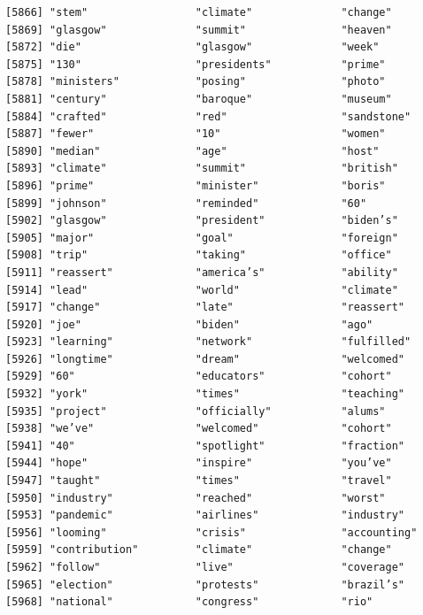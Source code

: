 \documentclass[
  letterpaper,
  DIV=11,
  numbers=noendperiod]{scrartcl}
\begin{document}
\begin{verbatim}
[5866] "stem"                 "climate"              "change"              
[5869] "glasgow"              "summit"               "heaven"              
[5872] "die"                  "glasgow"              "week"                
[5875] "130"                  "presidents"           "prime"               
[5878] "ministers"            "posing"               "photo"               
[5881] "century"              "baroque"              "museum"              
[5884] "crafted"              "red"                  "sandstone"           
[5887] "fewer"                "10"                   "women"               
[5890] "median"               "age"                  "host"                
[5893] "climate"              "summit"               "british"             
[5896] "prime"                "minister"             "boris"               
[5899] "johnson"              "reminded"             "60"                  
[5902] "glasgow"              "president"            "biden’s"             
[5905] "major"                "goal"                 "foreign"             
[5908] "trip"                 "taking"               "office"              
[5911] "reassert"             "america’s"            "ability"             
[5914] "lead"                 "world"                "climate"             
[5917] "change"               "late"                 "reassert"            
[5920] "joe"                  "biden"                "ago"                 
[5923] "learning"             "network"              "fulfilled"           
[5926] "longtime"             "dream"                "welcomed"            
[5929] "60"                   "educators"            "cohort"              
[5932] "york"                 "times"                "teaching"            
[5935] "project"              "officially"           "alums"               
[5938] "we’ve"                "welcomed"             "cohort"              
[5941] "40"                   "spotlight"            "fraction"            
[5944] "hope"                 "inspire"              "you’ve"              
[5947] "taught"               "times"                "travel"              
[5950] "industry"             "reached"              "worst"               
[5953] "pandemic"             "airlines"             "industry"            
[5956] "looming"              "crisis"               "accounting"          
[5959] "contribution"         "climate"              "change"              
[5962] "follow"               "live"                 "coverage"            
[5965] "election"             "protests"             "brazil’s"            
[5968] "national"             "congress"             "rio"                 

\end{verbatim}
\end{document}
